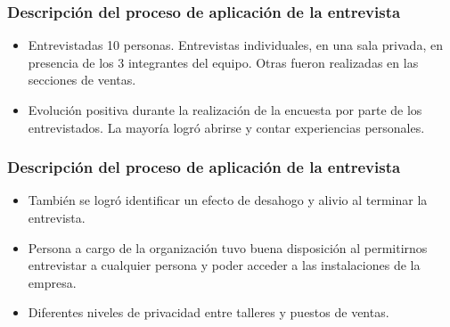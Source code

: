 \frame
{
\frametitle{Descripción del proceso de aplicación de la entrevista}

\begin{itemize}

	\item Entrevistadas 10 personas. Entrevistas individuales, en
una sala privada, en presencia de los 3 integrantes del equipo. 
Otras fueron realizadas en las secciones de ventas.

	\item Evolución positiva durante la realización de la encuesta por parte de los entrevistados.
La mayoría logró abrirse y contar experiencias personales.

\end{itemize}

}

\frame
{\frametitle{Descripción del proceso de aplicación de la entrevista}

\begin{itemize}
	\item También se logró identificar un efecto de desahogo y alivio al terminar la entrevista.
 
	\item Persona a cargo de la organización tuvo buena disposición al permitirnos
entrevistar a cualquier persona y poder acceder a las instalaciones de la empresa.

	\item Diferentes niveles de privacidad entre talleres y puestos de ventas.
\end{itemize}

}
